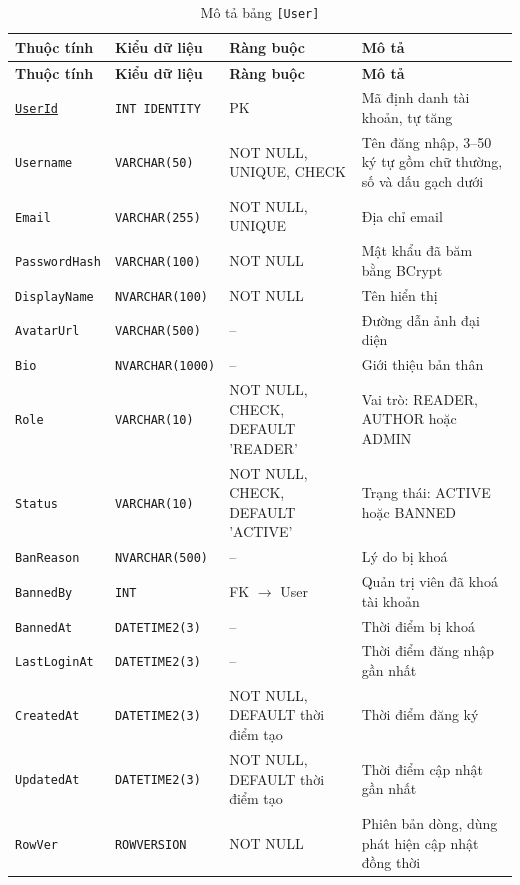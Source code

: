 {\small
\renewcommand{\arraystretch}{1.2}
\begin{longtable}{|>{\raggedright\arraybackslash}p{3.1cm}|>{\raggedright\arraybackslash}p{2.7cm}|>{\raggedright\arraybackslash}p{4.0cm}|>{\raggedright\arraybackslash}p{5.4cm}|}
\caption{Mô tả bảng \texttt{[User]}}\label{tab:db-user}\\
\hline
\textbf{Thuộc tính} & \textbf{Kiểu dữ liệu} & \textbf{Ràng buộc} & \textbf{Mô tả} \\ \hline
\endfirsthead
\hline
\textbf{Thuộc tính} & \textbf{Kiểu dữ liệu} & \textbf{Ràng buộc} & \textbf{Mô tả} \\ \hline
\endhead
\underline{\texttt{UserId}} & \texttt{INT IDENTITY} & PK & Mã định danh tài khoản, tự tăng \\ \hline
\texttt{Username} & \texttt{VARCHAR(50)} & NOT NULL, UNIQUE, CHECK & Tên đăng nhập, 3--50 ký tự gồm chữ thường, số và dấu gạch dưới \\ \hline
\texttt{Email} & \texttt{VARCHAR(255)} & NOT NULL, UNIQUE & Địa chỉ email \\ \hline
\texttt{PasswordHash} & \texttt{VARCHAR(100)} & NOT NULL & Mật khẩu đã băm bằng BCrypt \\ \hline
\texttt{DisplayName} & \texttt{NVARCHAR(100)} & NOT NULL & Tên hiển thị \\ \hline
\texttt{AvatarUrl} & \texttt{VARCHAR(500)} & -- & Đường dẫn ảnh đại diện \\ \hline
\texttt{Bio} & \texttt{NVARCHAR(1000)} & -- & Giới thiệu bản thân \\ \hline
\texttt{Role} & \texttt{VARCHAR(10)} & NOT NULL, CHECK, DEFAULT 'READER' & Vai trò: READER, AUTHOR hoặc ADMIN \\ \hline
\texttt{Status} & \texttt{VARCHAR(10)} & NOT NULL, CHECK, DEFAULT 'ACTIVE' & Trạng thái: ACTIVE hoặc BANNED \\ \hline
\texttt{BanReason} & \texttt{NVARCHAR(500)} & -- & Lý do bị khoá \\ \hline
\texttt{BannedBy} & \texttt{INT} & FK $\rightarrow$ User & Quản trị viên đã khoá tài khoản \\ \hline
\texttt{BannedAt} & \texttt{DATETIME2(3)} & -- & Thời điểm bị khoá \\ \hline
\texttt{LastLoginAt} & \texttt{DATETIME2(3)} & -- & Thời điểm đăng nhập gần nhất \\ \hline
\texttt{CreatedAt} & \texttt{DATETIME2(3)} & NOT NULL, DEFAULT thời điểm tạo & Thời điểm đăng ký \\ \hline
\texttt{UpdatedAt} & \texttt{DATETIME2(3)} & NOT NULL, DEFAULT thời điểm tạo & Thời điểm cập nhật gần nhất \\ \hline
\texttt{RowVer} & \texttt{ROWVERSION} & NOT NULL & Phiên bản dòng, dùng phát hiện cập nhật đồng thời \\ \hline
\end{longtable}
}

